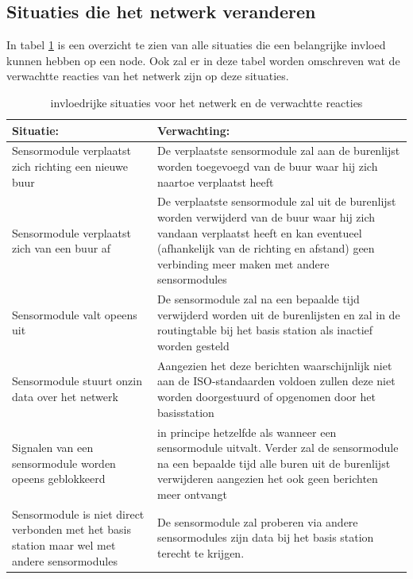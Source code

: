 \documentclass[a4paper, 11pt]{article}
\begin{document}
\subsection{Situaties die het netwerk veranderen} \label{SituatieOmschrijving}
In tabel \ref{Situaties} is een overzicht te zien van alle situaties die een belangrijke invloed kunnen hebben op een node. Ook zal er in deze tabel worden omschreven wat de verwachtte reacties van het netwerk zijn op deze situaties.
\begin{table}[ht]
	\centering
	\caption{invloedrijke situaties voor het netwerk en de verwachtte reacties}
	\begin{tabular}{ | m{6cm} | m{6cm}| } 
		\hline
		\textbf{Situatie:} & \textbf{Verwachting:} \\
		\hline
		Sensormodule verplaatst zich richting een nieuwe buur & De verplaatste sensormodule zal aan de burenlijst worden toegevoegd van de buur waar hij zich naartoe verplaatst heeft
		\\
		\hline
		Sensormodule verplaatst zich van een buur af & De verplaatste sensormodule zal uit de burenlijst worden verwijderd van de buur waar hij zich vandaan verplaatst heeft en kan eventueel (afhankelijk van de richting en afstand) geen verbinding meer maken met andere sensormodules
		\\
		\hline
		Sensormodule valt opeens uit  & De sensormodule zal na een bepaalde tijd verwijderd worden uit de burenlijsten en zal in de routingtable bij het basis station als inactief worden gesteld
		\\ 
		\hline
		Sensormodule stuurt onzin data over het netwerk & Aangezien het deze berichten waarschijnlijk niet aan de ISO-standaarden voldoen zullen deze niet worden doorgestuurd of opgenomen door het basisstation
		\\ 
		\hline
		Signalen van een sensormodule worden opeens geblokkeerd & in principe hetzelfde als wanneer een sensormodule uitvalt. Verder zal de sensormodule na een bepaalde tijd alle buren uit de burenlijst verwijderen aangezien het ook geen berichten meer ontvangt
		\\ 
		\hline
		Sensormodule is niet direct verbonden met het basis station maar wel met andere sensormodules & De sensormodule zal proberen via andere sensormodules zijn data bij het basis station terecht te krijgen.
		\\
		\hline
	\end{tabular} 
	\label{Situaties}
\end{table}
\end{document}
